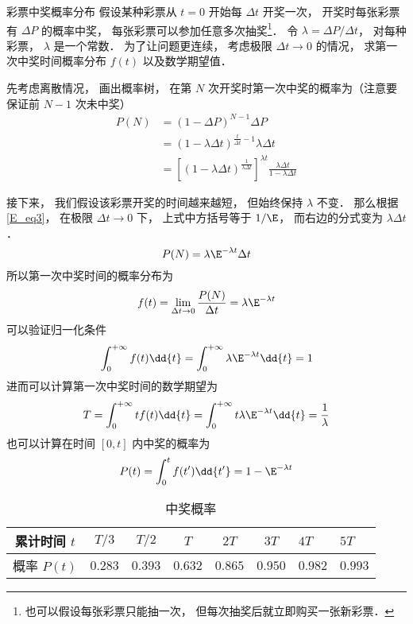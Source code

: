 \begin{example}{彩票中奖概率分布}
假设某种彩票从 $t = 0$ 开始每 $\Delta t$ 开奖一次， 开奖时每张彩票有 $\Delta P$ 的概率中奖， 每张彩票可以参加任意多次抽奖\footnote{也可以假设每张彩票只能抽一次， 但每次抽奖后就立即购买一张新彩票．}． 令 $\lambda = {\Delta P}/{\Delta t}$， 对每种彩票， $\lambda$ 是一个常数． 为了让问题更连续， 考虑极限 $\Delta t\to 0$ 的情况， 求第一次中奖时间概率分布 $f(t)$ 以及数学期望值．

先考虑离散情况， 画出概率树， 在第 $N$ 次开奖时第一次中奖的概率为（注意要保证前 $N-1$ 次未中奖）
\begin{equation}
\begin{aligned}
P(N) &= (1-\Delta P)^{N-1} \Delta P\\
&= (1-\lambda\Delta t)^{\frac{t}{\Delta t}-1} \lambda\Delta t\\
&= [(1-\lambda\Delta t)^{\frac{1}{\lambda\Delta t}}]^{\lambda t} \frac{\lambda\Delta t}{1-\lambda\Delta t}
\end{aligned}
\end{equation}

接下来， 我们假设该彩票开奖的时间越来越短， 但始终保持 $\lambda$ 不变． 那么根据\autoref{E_eq3}， 在极限 $\Delta t\to 0$ 下， 上式中方括号等于 $1/\E$， 而右边的分式变为 $\lambda \Delta t$．
\begin{equation}
P(N) = \lambda\E^{-\lambda t}\Delta t
\end{equation}
所以第一次中奖时间的概率分布为
\begin{equation}
f(t) = \lim_{\Delta t\to 0} \frac{P(N)}{\Delta t} = \lambda\E^{-\lambda t}
\end{equation}
可以验证归一化条件
\begin{equation}
\int_0^{+\infty} f(t) \dd{t} = \int_0^{+\infty} \lambda\E^{-\lambda t} \dd{t} = 1
\end{equation}
进而可以计算第一次中奖时间的数学期望为
\begin{equation}
T = \int_0^{+\infty} t f(t) \dd{t} = \int_0^{+\infty}t \lambda\E^{-\lambda t} \dd{t} = \frac{1}{\lambda}
\end{equation}
也可以计算在时间 $[0, t]$ 内中奖的概率为
\begin{equation}
P(t) = \int_0^{t} f(t') \dd{t'} = 1 - \E^{-\lambda t}
\end{equation}
\begin{table}[ht]
\centering
\caption{中奖概率}\label{E_tab2}
\begin{tabular}{|c|c|c|c|c|c|}
\hline
累计时间 $t$ & $T/3$  & $T/2$  & $T$     & $2T$ &     $3T$   &  $4T$   & $5T$\\
\hline
概率 $P(t)$ & $0.283$ & $0.393$ & $0.632$ & $0.865$ & $0.950$ & $0.982$ & $0.993$\\
\hline
\end{tabular}
\end{table}
\end{example}
